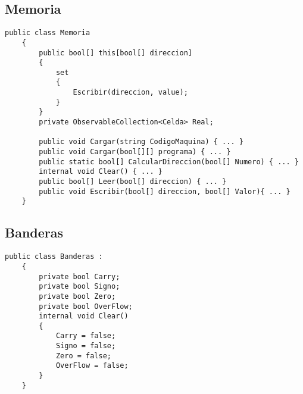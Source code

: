\documentclass[conference]{IEEEtran}
\begin{document}
\begin{figure*}[t]
    \subsection{Memoria}
\begin{lstlisting}[language={[Sharp]C}, title={Memoria}]
    public class Memoria 
    {
        public bool[] this[bool[] direccion]
        {
            set
            {
                Escribir(direccion, value);
            }
        }
        private ObservableCollection<Celda> Real;

        public void Cargar(string CodigoMaquina) { ... }
        public void Cargar(bool[][] programa) { ... }
        public static bool[] CalcularDireccion(bool[] Numero) { ... }
        internal void Clear() { ... }
        public bool[] Leer(bool[] direccion) { ... }
        public void Escribir(bool[] direccion, bool[] Valor){ ... }
    }
\end{lstlisting}
\end{figure*}
\newpage

\begin{figure*}[t]
    \subsection{Banderas}
\begin{lstlisting}[language={[Sharp]C}, title={Banderas}]
    public class Banderas :
    {
        private bool Carry;    
        private bool Signo;   
        private bool Zero;
        private bool OverFlow;
        internal void Clear()
        {
            Carry = false;
            Signo = false;
            Zero = false;
            OverFlow = false;
        }
    }
\end{lstlisting}
\end{figure*}
\end{document}
